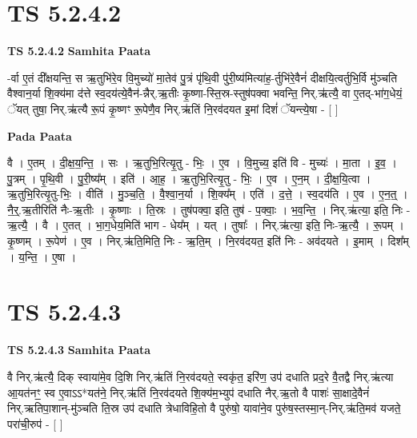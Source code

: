 \documentclass[17pt]{extarticle}
\begin{document}
\section{ TS 5.2.4.2 }

\textbf{TS 5.2.4.2 } \newline
\textbf{Samhita Paata} \newline

-र्वा ए॒तं दी᳚क्षयन्ति॒ स ऋ॒तुभि॑रे॒व वि॒मुच्यो॑ मा॒तेव॑ पु॒त्रं पृ॑थि॒वी पु॑री॒ष्य॑मित्या॑ह॒-र्तुभि॑रे॒वैनं॑ दीक्षयि॒त्वर्तुभि॒र्वि मु॑ञ्चति वैश्वान॒र्या शि॒क्य॑मा द॑त्ते स्व॒दय॑त्ये॒वैन॑-न्नैर्.ऋ॒तीः कृ॒ष्णा-स्ति॒स्र-स्तुष॑पक्वा भवन्ति॒ निर्.ऋ॑त्यै॒ वा ए॒तद्-भा॑ग॒धेयं॒ ॅयत् तुषा॒ निर्.ऋ॑त्यै रू॒पं कृ॒ष्णꣳ रू॒पेणै॒व निर्.ऋ॑तिं नि॒रव॑दयत इ॒मां दिशं॑ ॅयन्त्ये॒षा - [  ] \newline

\textbf{Pada Paata} \newline

वै । ए॒तम् । दी॒क्ष॒य॒न्ति॒ । सः । ऋ॒तुभि॒रित्यृ॒तु - भिः॒ । ए॒व । वि॒मुच्य॒ इति॑ वि - मुच्यः॑ । मा॒ता । इ॒व॒ । पु॒त्रम् । पृ॒थि॒वी । पु॒री॒ष्य᳚म् । इति॑ । आ॒ह॒ । ऋ॒तुभि॒रित्यृ॒तु - भिः॒ । ए॒व । ए॒न॒म् । दी॒क्ष॒यि॒त्वा । ऋ॒तुभि॒रित्यृ॒तु-भिः॒ । वीति॑ । मु॒ञ्च॒ति॒ । वै॒श्वा॒न॒र्या । शि॒क्य᳚म् । एति॑ । द॒त्ते॒ । स्व॒दय॑ति । ए॒व । ए॒न॒त्॒ । नै॒र्॒.ऋ॒तीरिति॑ नैः-ऋ॒तीः । कृ॒ष्णाः । ति॒स्रः । तुष॑पक्वा॒ इति॒ तुष॑ - प॒क्वाः॒ । भ॒व॒न्ति॒ । निर्.ऋ॑त्या॒ इति॒ निः - ऋ॒त्यै॒ । वै । ए॒तत् । भा॒ग॒धेय॒मिति॑ भाग - धेय᳚म् । यत् । तुषाः᳚ । निर्.ऋ॑त्या॒ इति॒ निः-ऋ॒त्यै॒ । रू॒पम् । कृ॒ष्णम् । रू॒पेण॑ । ए॒व । निर्.ऋ॑ति॒मिति॒ निः - ऋ॒ति॒म् । नि॒रव॑दयत॒ इति॑ निः - अव॑दयते । इ॒माम् । दिश᳚म् । य॒न्ति॒ । ए॒षा ।  \newline





\section{ TS 5.2.4.3 }

\textbf{TS 5.2.4.3 } \newline
\textbf{Samhita Paata} \newline

वै निर्.ऋ॑त्यै॒ दिक् स्वाया॑मे॒व दि॒शि निर्.ऋ॑तिं नि॒रव॑दयते॒ स्वकृ॑त॒ इरि॑ण॒ उप॑ दधाति प्रद॒रे वै॒तद्वै निर्.ऋ॑त्या आ॒यत॑नꣳ॒॒ स्व ए॒वाऽऽ*यत॑ने॒ निर्.ऋ॑तिं नि॒रव॑दयते शि॒क्य॑म॒भ्युप॑ दधाति नैर्.ऋ॒तो वै पाशः॑ सा॒क्षादे॒वैनं॑ निर्.ऋतिपा॒शान्-मु॑ञ्चति ति॒स्र उप॑ दधाति त्रेधाविहि॒तो वै पुरु॑षो॒ यावा॑ने॒व पुरु॑ष॒स्तस्मा॒न्-निर्.ऋ॑ति॒मव॑ यजते॒ परा॑ची॒रुप॑ - [  ] \newline
\end{document}
